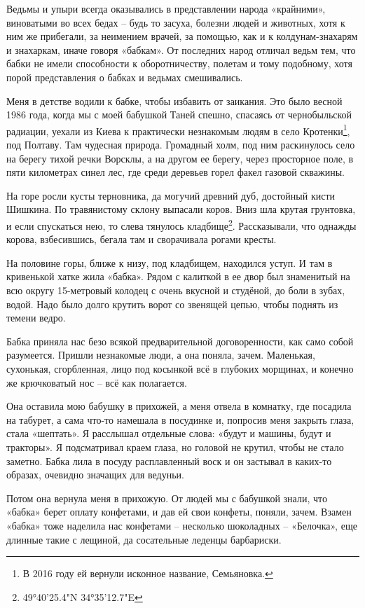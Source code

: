 Ведьмы и упыри всегда оказывались в представлении народа «крайними», виноватыми во всех бедах – будь то засуха, болезни людей и животных, хотя к ним же прибегали, за неимением врачей, за помощью, как и к колдунам-знахарям и знахаркам, иначе говоря «бабкам». От последних народ отличал ведьм тем, что бабки не имели способности к оборотничеству, полетам и тому подобному, хотя порой представления о бабках и ведьмах смешивались.

Меня в детстве водили к бабке, чтобы избавить от заикания. Это было весной 1986 года, когда мы с моей бабушкой Таней спешно, спасаясь от чернобыльской радиации, уехали из Киева к практически незнакомым людям в село Кротенки\footnote{В 2016 году ей вернули исконное название, Семьяновка.}, под Полтаву. Там чудесная природа. Громадный холм, под ним раскинулось село на берегу тихой речки Ворсклы, а на другом ее берегу, через просторное поле, в пяти километрах синел лес, где среди деревьев горел факел газовой скважины.

На горе росли кусты терновника, да могучий древний дуб, достойный кисти Шишкина. По травянистому склону выпасали коров. Вниз шла крутая грунтовка, и если спускаться нею, то слева тянулось кладбище\footnote{49°40'25.4"N 34°35'12.7"E}. Рассказывали, что однажды корова, взбесившись, бегала там и сворачивала рогами кресты.

На половине горы, ближе к низу, под кладбищем, находился уступ. И там в кривенькой хатке жила «бабка». Рядом с калиткой в ее двор был знаменитый на всю округу 15-метровый колодец с очень вкусной и студёной, до боли в зубах, водой. Надо было долго крутить ворот со звенящей цепью, чтобы поднять из темени ведро.

Бабка приняла нас безо всякой предварительной договоренности, как само собой разумеется. Пришли незнакомые люди, а она поняла, зачем. Маленькая, сухонькая, сгорбленная, лицо под косынкой всё в глубоких морщинах, и конечно же крючковатый нос – всё как полагается.

Она оставила мою бабушку в прихожей, а меня отвела в комнатку, где посадила на табурет, а сама что-то намешала в посудинке и, попросив меня закрыть глаза, стала «шептать». Я расслышал отдельные слова: «будут и машины, будут и тракторы». Я подсматривал краем глаза, но головой не крутил, чтобы не стало заметно. Бабка лила в посуду расплавленный воск и он застывал в каких-то образах, очевидно значащих для ведуньи.

Потом она вернула меня в прихожую. От людей мы с бабушкой знали, что «бабка» берет оплату конфетами, и дав ей свои конфеты, поняли, зачем. Взамен «бабка» тоже наделила нас конфетами – несколько шоколадных – «Белочка», еще длинные такие с лещиной, да сосательные леденцы барбариски.

